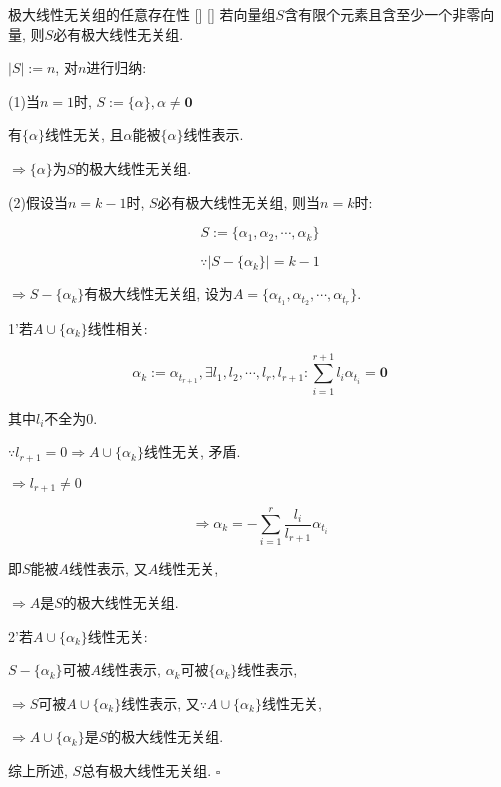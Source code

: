 \documentclass[UTF8]{ctexart}
\begin{document}
		\begin{ppt}
			[]
			{极大线性无关组的任意存在性}
			[]
			[]
			若向量组$S$含有限个元素且含至少一个非零向量, 则$S$必有极大线性无关组. 
			
		\end{ppt}
		\begin{prf}
		
			$|S|:=n$, 对$n$进行归纳: 
			
			(1)当$n=1$时, $S:=\{\alpha\}, \alpha \neq \mathbf{0}$
			
			有$\{\alpha\}$线性无关, 且$\alpha$能被$\{\alpha\}$线性表示. 
			
			$\Longrightarrow\{\alpha\}$为$S$的极大线性无关组. 
			
			(2)假设当$n=k-1$时, $S$必有极大线性无关组, 则当$n=k$时: 
			
			$$S:=\{\alpha_{1}, \alpha_{2}, \cdots, \alpha_{k}\}$$
			
			$$\because|S-\{\alpha_{k}\}|=k-1$$
			
			$\Longrightarrow S-\{\alpha_{k}\}$有极大线性无关组, 设为$A=\{\alpha_{t_{1}}, \alpha_{t_{2}}, \cdots, \alpha_{t_{r}}\}$. 
			
			1'若$A\cup \{\alpha_{k}\}$线性相关: 
			
			$$\alpha_{k}:=\alpha_{t_{r+1}},\exists l_{1},l_{2},\cdots,l_{r},l_{r+1}: \sum_{i=1}^{r+1}l_{i}\alpha_{t_{i}}=\mathbf{0}$$
			
			其中$l_{i}$不全为0. 
			
			$\because l_{r+1}=0\Longrightarrow A\cup \{\alpha_{k}\}$线性无关, 矛盾. 
			
			$\Longrightarrow l_{r+1}\neq 0$
			
			$$\Longrightarrow\alpha_{k}=-\sum_{i=1}^{r}\frac{l_{i}}{l_{r+1}}\alpha_{t_{i}}$$
			
			即$S$能被$A$线性表示, 又$A$线性无关, 
			
			$\Longrightarrow A$是$S$的极大线性无关组. 
			
			2'若$A\cup \{\alpha_{k}\}$线性无关:
			
			$S-\{\alpha_{k}\}$可被$A$线性表示, $\alpha_{k}$可被$\{\alpha_{k}\}$线性表示, 
			
			$\Longrightarrow S$可被$A\cup \{\alpha_{k}\}$线性表示, 又$\because A\cup \{\alpha_{k}\}$线性无关, 
			
			$\Longrightarrow A\cup \{\alpha_{k}\}$是$S$的极大线性无关组. 
			
			综上所述, $S$总有极大线性无关组. $\square$
		\end{prf}
  
\end{document}
